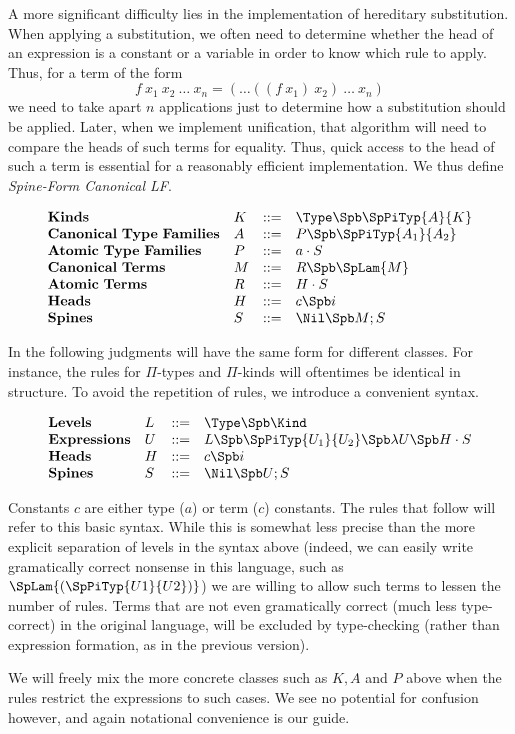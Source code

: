  A more significant 
difficulty lies in the implementation of hereditary substitution. 
When applying a substitution, we often need to determine whether
the head of an expression is a constant or a variable in order
to know which rule to apply.  Thus, for a term of the form
$$f\ x_1\ x_2\ \ldots\ x_n = (\ldots((f\ x_1)\ x_2)\ \ldots\ x_n) $$
we need to take apart $n$ applications just to determine how
a substitution should be applied.  Later, when we implement
unification, that algorithm will need to compare the heads
of such terms for equality.  Thus, quick access to the head
of such a term is essential for a reasonably efficient implementation.
We thus define \emph{Spine-Form Canonical LF}.

$$
\begin{array}{llll}
\mathbf{Kinds} & K & ::= & \Type \Spb \SpPiTyp{A}{K} \\
\mathbf{Canonical\ Type\ Families} & A & ::= & P \Spb \SpPiTyp{A_1}{A_2} \\
\mathbf{Atomic\ Type\ Families} & P & ::= & a\cdot S \\
\mathbf{Canonical\ Terms} & M & ::= & R \Spb \SpLam{M} \\
\mathbf{Atomic\ Terms} & R & ::= & H\cdot S \\
\mathbf{Heads} & H & ::= & c \Spb i\\
\mathbf{Spines} & S & ::= & \Nil \Spb M;S\\
\end{array} 
$$

In the following judgments will have the same
form for different classes.  For instance,
the rules for $\Pi$-types and $\Pi$-kinds will
oftentimes be identical in structure.  To avoid the
repetition of rules, we introduce a convenient 
syntax.

$$
\begin{array}{llll}
\mathbf{Levels} & L & ::= & \Type \Spb \Kind \\
\mathbf{Expressions} & U & ::= & L \Spb \SpPiTyp{U_1}{U_2} \Spb \lambda U \Spb H\cdot S \\
\mathbf{Heads} & H & ::= & c \Spb i\\
\mathbf{Spines} & S & ::= & \Nil \Spb U;S\\
\end{array} 
$$

Constants $c$ are either type ($a$) or term ($c$) constants.
The rules that follow will refer to this basic syntax.  While this
is somewhat less precise than the more explicit separation of 
levels in the syntax above (indeed, we can easily write gramatically
correct nonsense in this language, such as $\SpLam{(\SpPiTyp{U1}{U2})}$)
we are willing to allow such terms to lessen the number of rules.
Terms that are not even gramatically correct (much less type-correct) 
in the original language, will be excluded by type-checking (rather than expression 
formation, as in the previous version).

We will freely mix the more concrete classes such as $K,A$ and $P$
above when the rules restrict the expressions to such cases.
We see no potential for confusion however, and again notational
convenience is our guide.  


